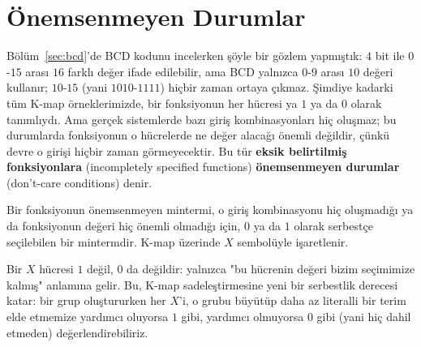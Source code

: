 \section{Önemsenmeyen Durumlar}\label{sec:dont-care}
Bölüm~\ref{sec:bcd}'de BCD kodunu incelerken şöyle bir gözlem yapmıştık: $4$ bit ile
$0$-$15$ arası $16$ farklı değer ifade edilebilir, ama BCD yalnızca $0$-$9$ arası
$10$ değeri kullanır; $10$-$15$ (yani $1010$-$1111$) hiçbir zaman ortaya çıkmaz.
Şimdiye kadarki tüm K-map örneklerimizde, bir fonksiyonun her hücresi ya $1$ ya da
$0$ olarak tanımlıydı. Ama gerçek sistemlerde bazı giriş kombinasyonları hiç
oluşmaz; bu durumlarda fonksiyonun o hücrelerde ne değer alacağı önemli değildir,
çünkü devre o girişi hiçbir zaman görmeyecektir. Bu tür \textbf{eksik belirtilmiş
fonksiyonlara} (incompletely specified functions) \textbf{önemsenmeyen durumlar}
(don't-care conditions) denir.

\begin{tanim}
Bir fonksiyonun önemsenmeyen mintermi, o giriş kombinasyonu hiç oluşmadığı ya da
fonksiyonun değeri hiç önemli olmadığı için, $0$ ya da $1$ olarak serbestçe
seçilebilen bir mintermdir. K-map üzerinde $X$ sembolüyle işaretlenir.
\end{tanim}

Bir $X$ hücresi $1$ değil, $0$ da değildir: yalnızca "bu hücrenin değeri
bizim seçimimize kalmış" anlamına gelir. Bu, K-map sadeleştirmesine yeni bir
serbestlik derecesi katar: bir grup oluştururken her $X$'i, o grubu büyütüp
daha az literalli bir terim elde etmemize yardımcı oluyorsa $1$ gibi, yardımcı
olmuyorsa $0$ gibi (yani hiç dahil etmeden) değerlendirebiliriz.

